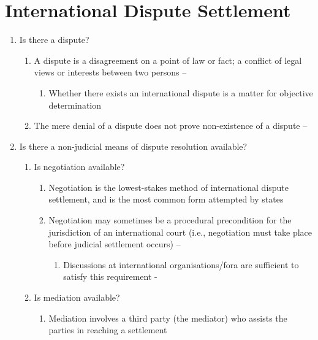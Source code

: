 \section{International Dispute Settlement}\label{scaffold:Topic 13}
\begin{enumerate}
    \item Is there a dispute?
    \begin{enumerate}
        \item A dispute is a disagreement on a point of law or fact; a conflict of legal views or interests between two persons -- 
        \begin{enumerate}
            \item Whether there exists an international dispute is a matter for objective determination
        \end{enumerate}
        \item The mere denial of a dispute does not prove non-existence of a dispute -- 
    \end{enumerate}
    \item Is there a non-judicial means of dispute resolution available?
    \begin{enumerate}
        \item Is negotiation available?
        \begin{enumerate}
            \item Negotiation is the lowest-stakes method of international dispute settlement, and is the most common form attempted by states
            \item Negotiation may sometimes be a procedural precondition for the jurisdiction of an international court (i.e., negotiation must take place before judicial settlement occurs) -- 
            \begin{enumerate}
                \item Discussions at international organisations/fora are sufficient to satisfy this requirement - 
            \end{enumerate}
        \end{enumerate}
        \item Is mediation available?
        \begin{enumerate}
            \item Mediation involves a third party (the mediator) who assists the parties in reaching a settlement

\end{enumerate}
\end{enumerate}
\end{enumerate}
